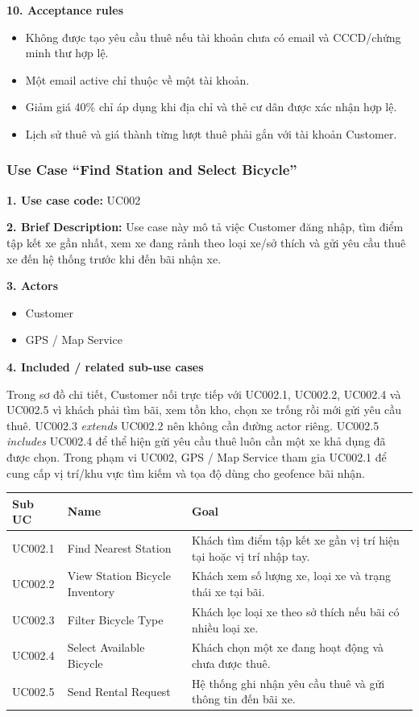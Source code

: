 \textbf{10. Acceptance rules}
\begin{itemize}
  \item Không được tạo yêu cầu thuê nếu tài khoản chưa có email và CCCD/chứng minh thư hợp lệ.
  \item Một email active chỉ thuộc về một tài khoản.
  \item Giảm giá 40\% chỉ áp dụng khi địa chỉ và thẻ cư dân được xác nhận hợp lệ.
  \item Lịch sử thuê và giá thành từng lượt thuê phải gắn với tài khoản Customer.
\end{itemize}

\newpage
\subsubsection{Use Case ``Find Station and Select Bicycle''}

\textbf{1. Use case code:} UC002

\textbf{2. Brief Description:} Use case này mô tả việc Customer đăng nhập, tìm
điểm tập kết xe gần nhất, xem xe đang rảnh theo loại xe/sở thích và gửi yêu cầu
thuê xe đến hệ thống trước khi đến bãi nhận xe.

\textbf{3. Actors}
\begin{itemize}
  \item Customer
  \item GPS / Map Service
\end{itemize}

\textbf{4. Included / related sub-use cases}

Trong sơ đồ chi tiết, Customer nối trực tiếp với UC002.1, UC002.2, UC002.4 và
UC002.5 vì khách phải tìm bãi, xem tồn kho, chọn xe trống rồi mới gửi yêu cầu
thuê. UC002.3 \textit{extends} UC002.2 nên không cần đường actor riêng. UC002.5
\textit{includes} UC002.4 để thể hiện gửi yêu cầu thuê luôn cần một xe khả dụng
đã được chọn. Trong phạm vi UC002, GPS / Map Service tham gia UC002.1 để cung cấp
vị trí/khu vực tìm kiếm và tọa độ dùng cho geofence bãi nhận.

\begin{longtable}{P{0.18\textwidth}P{0.30\textwidth}P{0.42\textwidth}}
\toprule
\textbf{Sub UC} & \textbf{Name} & \textbf{Goal} \\
\midrule
UC002.1 & Find Nearest Station & Khách tìm điểm tập kết xe gần vị trí hiện tại hoặc vị trí nhập tay. \\
UC002.2 & View Station Bicycle Inventory & Khách xem số lượng xe, loại xe và trạng thái xe tại bãi. \\
UC002.3 & Filter Bicycle Type & Khách lọc loại xe theo sở thích nếu bãi có nhiều loại xe. \\
UC002.4 & Select Available Bicycle & Khách chọn một xe đang hoạt động và chưa được thuê. \\
UC002.5 & Send Rental Request & Hệ thống ghi nhận yêu cầu thuê và gửi thông tin đến bãi xe. \\
\bottomrule
\end{longtable}

